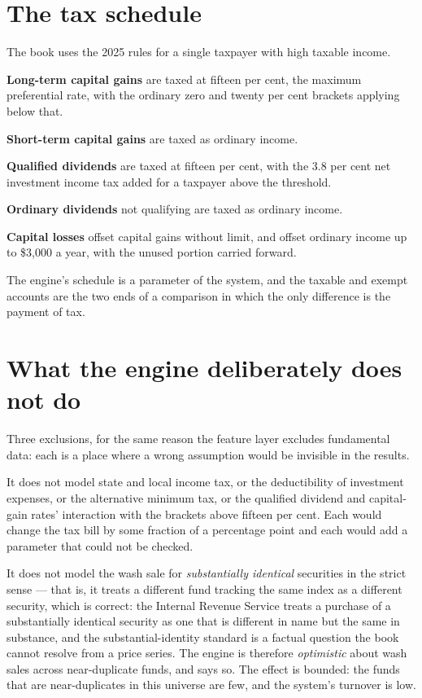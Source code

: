 \section{The tax schedule}

The book uses the 2025 rules for a single taxpayer with high taxable
income.

\textbf{Long-term capital gains} are taxed at fifteen per cent, the
maximum preferential rate, with the ordinary zero and twenty per cent
brackets applying below that.

\textbf{Short-term capital gains} are taxed as ordinary income.

\textbf{Qualified dividends} are taxed at fifteen per cent, with the
3.8 per cent net investment income tax added for a taxpayer above the
threshold.

\textbf{Ordinary dividends} not qualifying are taxed as ordinary income.

\textbf{Capital losses} offset capital gains without limit, and offset
ordinary income up to \$3,000 a year, with the unused portion carried
forward.

The engine's schedule is a parameter of the system, and the taxable and
exempt accounts are the two ends of a comparison in which the only
difference is the payment of tax.

\section{What the engine deliberately does not do}

Three exclusions, for the same reason the feature layer excludes
fundamental data: each is a place where a wrong assumption would be
invisible in the results.

It does not model state and local income tax, or the deductibility of
investment expenses, or the alternative minimum tax, or the qualified
dividend and capital-gain rates' interaction with the brackets above
fifteen per cent. Each would change the tax bill by some fraction of a
percentage point and each would add a parameter that could not be
checked.

It does not model the wash sale for \emph{substantially identical} securities
in the strict sense --- that is, it treats a different fund tracking the
same index as a different security, which is correct: the Internal
Revenue Service treats a purchase of a substantially identical security as
one that is different in name but the same in substance, and the
substantial-identity standard is a factual question the book cannot
resolve from a price series. The engine is therefore \emph{optimistic}
about wash sales across near-duplicate funds, and says so. The effect is
bounded: the funds that are near-duplicates in this universe are few, and
the system's turnover is low.

